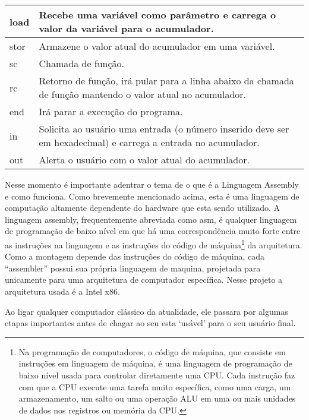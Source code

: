 \begin{longtable}{ |p{3cm}||p{11cm}|  }
  load &
  Recebe uma variável como parâmetro e carrega o valor da variável para o acumulador. \\
  \hline
  stor &
  Armazene o valor atual do acumulador em uma variável. \\
  \hline
  sc &
  Chamada de função. \\
  \hline
  rc &
  Retorno de função, irá pular para a linha abaixo da chamada de função mantendo o valor atual no acumulador. \\
  \hline
  end &
  Irá parar a execução do programa. \\
  \hline
  in &
  Solicita ao usuário uma entrada (o número inserido deve ser em hexadecimal) e carrega a entrada no acumulador. \\
  \hline
  out &
  Alerta o usuário com o valor atual do acumulador. \\
  \hline
\end{longtable}
\vspace{1cm}

Nesse momento é importante adentrar o tema de o que é a Linguagem Assembly e como funciona. Como brevemente mencionado acima, esta é uma linguagem de computação altamente dependente do hardware que esta sendo utilizado. A linguagem assembly, frequentemente abreviada como asm, é qualquer linguagem de programação de baixo nível em que há uma correspondência muito forte entre as instruções na linguagem e as instruções do código de máquina\footnote{Na programação de computadores, o código de máquina, que consiste em instruções em linguagem de máquina, é uma linguagem de programação de baixo nível usada para controlar diretamente uma CPU. Cada instrução faz com que a CPU execute uma tarefa muito específica, como uma carga, um armazenamento, um salto ou uma operação ALU em uma ou mais unidades de dados nos registros ou memória da CPU.} da arquitetura. Como a montagem depende das instruções do código de máquina, cada ``assembler'' possui sua própria linguagem de maquina, projetada para unicamente para uma arquitetura de computador específica. Nesse projeto a arquitetura usada é a Intel x86.

Ao ligar qualquer computador clássico da atualidade, ele passara por algumas etapas importantes antes de chagar ao seu esta `usável' para o seu usuário final. 

